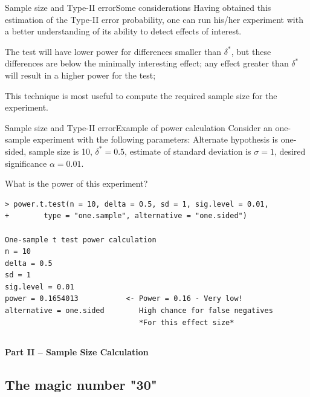
\begin{frame}{Sample size and Type-II error}{Some considerations}
  Having obtained this estimation of the Type-II error probability, one can run his/her experiment with a better understanding of its ability to detect effects of interest.\bigskip

  The test will have lower power for differences smaller than $\delta^*$, but these differences are below the minimally interesting effect; any effect greater than $\delta^*$ will result in a higher power for the test;\bigskip

  This technique is most useful to compute the required sample size for the   experiment.
\end{frame}

\begin{frame}[fragile]{Sample size and Type-II error}{Example of power calculation}
Consider an one-sample experiment with the following parameters: Alternate hypothesis is one-sided, sample size is 10, $\delta^*=0.5$, estimate of standard deviation is $\sigma=1$, desired significance $\alpha=0.01$.\medskip

What is the power of this experiment?

{\smaller
\begin{verbatim}
> power.t.test(n = 10, delta = 0.5, sd = 1, sig.level = 0.01,
+        type = "one.sample", alternative = "one.sided")

One-sample t test power calculation
n = 10
delta = 0.5
sd = 1
sig.level = 0.01
power = 0.1654013           <- Power = 0.16 - Very low!
alternative = one.sided        High chance for false negatives
                               *For this effect size*
\end{verbatim}}
\end{frame}


\subsection{}
\begin{frame}{}
  \begin{center}
    {\bf Part II -- Sample Size Calculation}
  \end{center}
\end{frame}


\subsection{The magic number "30"}

